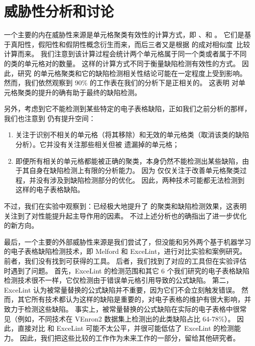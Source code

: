 \section{威胁性分析和讨论}

一个主要的内在威胁性来源是单元格聚类有效性的计算方式，即 \prc 、\rec 和 \fmc 。
它们是基于真阳性，假阳性和假阴性概念衍生而来，而后三者又是根据 \cu 的成对相似度~\cite{cheung2016custodes}比较计算而来。
我们注意到该计算过程会统计两个单元格属于同一个类或者属于不同的类的单元格对的数量。
这样的计算方式不同于衡量缺陷检测有效性的方式。
因此，研究 \wa 的单元格聚类和它的缺陷检测相关性结论可能在一定程度上受到影响。
然而，我们依然观察到 90\% 的工作表在我们的分析下是正相关的。
这表明 \wa 对单元格聚类的提升的确有助于最终的缺陷检测。

另外，考虑到它不能检测到某些特定的电子表格缺陷，正如我们之前分析的那样，我们也注意到 \wa 仍有提升空间：
\begin{enumerate}
    \item \wa 关注于识别不相关的单元格（将其移除）和无效的单元格类（取消该类的缺陷分析）。它并没有关注那些相关但被 \cu 遗漏掉的单元格；
    \item 即便所有相关的单元格都能被正确的聚类，\cu 本身仍然不能检测出某些缺陷，由于其自身在缺陷检测上有限的分析能力。
    因为 \wa 仅仅关注于改善单元格聚类过程，并没有涉及到缺陷检测部分的优化。
    因此，两种技术可能都无法检测到这样的电子表格缺陷。
\end{enumerate}

不过，我们在实验中观察到：\wa 已经极大地提升了 \cu 的聚类和缺陷检测效果，这表明 \wa 关注到了对性能提升起主导作用的因素。
不过上述分析也的确指出了进一步优化的新方向。

最后，一个主要的外部威胁性来源是我们尝试了，但没能和另外两个基于机器学习的电子表格缺陷检测技术，即 Melford\cite{singh2017melford} 和 ExceLint\cite{Barowy2018excelint}，进行对比实验和案例研究。
前者，我们没有找到可获得的工具。
后者，我们找到了对应的工具但在实验评估时遇到了问题。
首先，ExceLint 的检测范围和其它 6 个我们研究的电子表格缺陷检测技术很不一样，它仅检测由于错误单元格引用导致的公式缺陷。
第二，ExceLint 认为被常量替换的公式缺陷并不重要，因为它们不会立刻触发错误。
然而，其它所有技术都认为这样的缺陷是重要的，对电子表格的维护有很大影响，并致力于检测这些缺陷。
事实上，被常量替换的公式缺陷在实际的电子表格中很常见（例如，不同技术在 VEnron2 数据集上检测出的此类缺陷占比 64-78\%）。
因此，直接对比 \wa 和 ExceLint 可能不太公平，并很可能低估了 ExceLint 的检测能力。
因此，我们把这些比较的工作作为未来工作的一部分，留给其他研究者。
